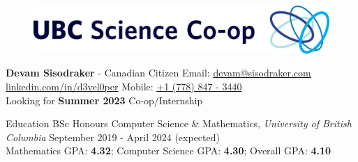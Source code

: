 



\begin{figure}
\includegraphics[scale=0.08,right]{logo.png}
\end{figure}


\Large \textbf{Devam Sisodraker} \normalsize - Canadian Citizen 
\hfill
Email: \underline{\href{mailto:devam@sisodraker.com}{devam@sisodraker.com}} \\
\underline{\href{https://linkedin.com/in/d3vel0per}{linkedin.com/in/d3vel0per}}
\hfill Mobile: \underline{\href{tel:+17788473440}{+1 (778) 847 - 3440}} \\
Looking for \textbf{Summer 2023} Co-op/Internship





\begin{rSection}{Education}
BSc Honours Computer Science \& Mathematics, \textit{University of British Columbia} \hfill {September 2019 - April 2024 (expected)} \\
Mathematics GPA: \textbf{4.32};
Computer Science GPA: \textbf{4.30};
Overall GPA: \textbf{4.10}
\end{rSection}


